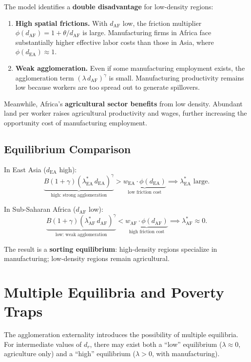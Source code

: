 \documentclass[12pt]{article}
\begin{document}
The model identifies a \textbf{double disadvantage} for low-density regions:

\begin{enumerate}
    \item \textbf{High spatial frictions.} With $d_{\text{AF}}$ low, the friction multiplier $\phi(d_{\text{AF}}) = 1 + \theta/d_{\text{AF}}$ is large. Manufacturing firms in Africa face substantially higher effective labor costs than those in Asia, where $\phi(d_{\text{EA}}) \approx 1$.

    \item \textbf{Weak agglomeration.} Even if some manufacturing employment exists, the agglomeration term $(\lambda \, d_{\text{AF}})^\gamma$ is small. Manufacturing productivity remains low because workers are too spread out to generate spillovers.
\end{enumerate}

Meanwhile, Africa's \textbf{agricultural sector benefits} from low density. Abundant land per worker raises agricultural productivity and wages, further increasing the opportunity cost of manufacturing employment.

\subsection{Equilibrium Comparison}

In East Asia ($d_{\text{EA}}$ high):
\[
    \underbrace{B(1+\gamma)(\lambda^*_{\text{EA}} \, d_{\text{EA}})^\gamma}_{\text{high: strong agglomeration}} > \underbrace{w_{\text{EA}} \cdot \phi(d_{\text{EA}})}_{\text{low friction cost}} \implies \lambda^*_{\text{EA}} \text{ large}.
\]

In Sub-Saharan Africa ($d_{\text{AF}}$ low):
\[
    \underbrace{B(1+\gamma)(\lambda^*_{\text{AF}} \, d_{\text{AF}})^\gamma}_{\text{low: weak agglomeration}} < \underbrace{w_{\text{AF}} \cdot \phi(d_{\text{AF}})}_{\text{high friction cost}} \implies \lambda^*_{\text{AF}} \approx 0.
\]

The result is a \textbf{sorting equilibrium}: high-density regions specialize in manufacturing; low-density regions remain agricultural.

\section{Multiple Equilibria and Poverty Traps}

The agglomeration externality introduces the possibility of multiple equilibria. For intermediate values of $d_r$, there may exist both a ``low'' equilibrium ($\lambda \approx 0$, agriculture only) and a ``high'' equilibrium ($\lambda > 0$, with manufacturing).
\end{document}
